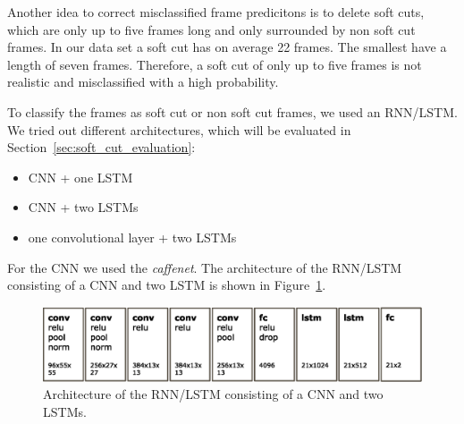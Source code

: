 Another idea to correct misclassified frame predicitons is to delete soft cuts, which are only up to five frames long and only surrounded by non soft cut frames.
In our data set a soft cut has on average 22 frames.
The smallest have a length of seven frames.
Therefore, a soft cut of only up to five frames is not realistic and misclassified with a high probability.

To classify the frames as soft cut or non soft cut frames, we used an RNN/LSTM.
We tried out different architectures, which will be evaluated in Section~\ref{sec:soft_cut_evaluation}:
\begin{itemize}
	\item CNN + one LSTM
	\item CNN + two LSTMs
	\item one convolutional layer + two LSTMs
\end{itemize}
For the CNN we used the \textit{caffenet}.
The architecture of the RNN/LSTM consisting of a CNN and two LSTM is shown in Figure~\ref{fig:net_architecture}.
\begin{figure}[!htb]
	\centering
	\includegraphics[scale=.5]{images/net_architecture.eps}
	\caption{Architecture of the RNN/LSTM consisting of a CNN and two LSTMs.}
	\label{fig:net_architecture}
\end{figure}
